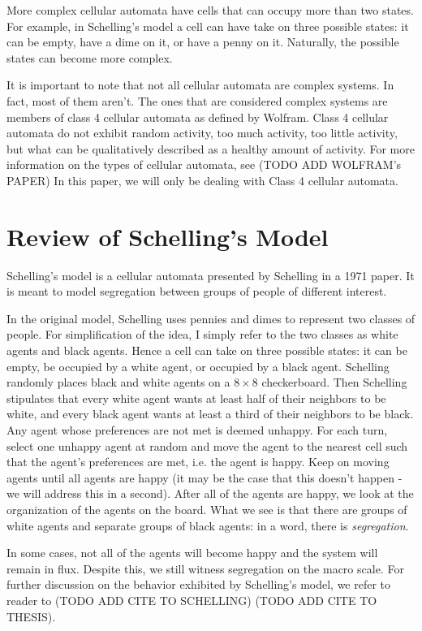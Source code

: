 \documentclass[11pt,twoside]{amsart}
\theoremstyle{theorem}
\theoremstyle{definition}
\theoremstyle{remark}
\begin{document}
More complex cellular automata have cells that can occupy more than two states. 
For example, in Schelling's model a cell can have take on three possible states: it can be empty, have a dime on it, or have a penny on it.
Naturally, the possible states can become more complex. 

It is important to note that not all cellular automata are complex systems. 
In fact, most of them aren't. 
The ones that are considered complex systems are members of class 4 cellular automata as defined by Wolfram. 
Class 4 cellular automata do not exhibit random activity, too much activity, too little activity, but what can be qualitatively described as a healthy amount of activity.
For more information on the types of cellular automata, see (TODO ADD WOLFRAM's PAPER)
In this paper, we will only be dealing with Class 4 cellular automata. 

\section{Review of Schelling's Model}
Schelling's model is a cellular automata presented by Schelling in a 1971 paper. 
It is meant to model segregation between groups of people of different interest. 

In the original model, Schelling uses pennies and dimes to represent two classes of people. 
For simplification of the idea, I simply refer to the two classes as white agents and black agents. 
Hence a cell can take on three possible states: it can be empty, be occupied by a white agent, or occupied by a black agent. 
Schelling randomly places black and white agents on a $8 \times 8$ checkerboard. 
Then Schelling stipulates that every white agent wants at least half of their neighbors to be white, and every black agent wants at least a third of their neighbors to be black.
Any agent whose preferences are not met is deemed unhappy. 
For each turn, select one unhappy agent at random and move the agent to the nearest cell such that the agent's preferences are met, i.e. the agent is happy.
Keep on moving agents until all agents are happy (it may be the case that this doesn't happen - we will address this in a second). 
After all of the agents are happy, we look at the organization of the agents on the board. 
What we see is that there are groups of white agents and separate groups of black agents: in a word, there is \emph{segregation}.

In some cases, not all of the agents will become happy and the system will remain in flux. 
Despite this, we still witness segregation on the macro scale. 
For further discussion on the behavior exhibited by Schelling's model, we refer to reader to (TODO ADD CITE TO SCHELLING) (TODO ADD CITE TO THESIS).
\end{document}
